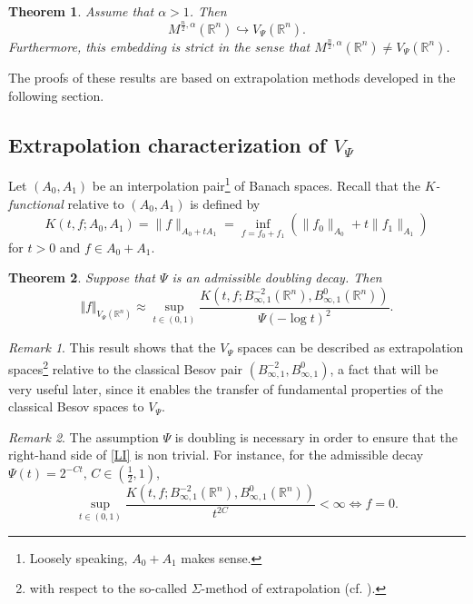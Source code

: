 \documentclass[11pt, a4paper,leqno]{amsart}
\newtheorem{theorem}{Theorem}
\theoremstyle{plain}
\numberwithin{equation}{section}
\theoremstyle{definition}
\theoremstyle{remark}
\newtheorem{remark}{Remark}
\def\R{\mathbb{R}}
\begin{document}
\begin{theorem}\label{Thm11}
Assume that $\alpha > 1$. Then $$M^{\frac{n}{2}, \alpha}(\R^n) \hookrightarrow V_\Psi(\R^n).$$ Furthermore, this embedding is strict in the sense that $M^{\frac{n}{2}, \alpha}(\R^n) \neq V_\Psi(\R^n)$.
\end{theorem}


The proofs of these results are based on extrapolation methods developed in the following section. 

\subsection{Extrapolation characterization of $V_\Psi$}

Let $(A_0, A_1)$ be an interpolation pair\footnote{Loosely speaking, $A_0+A_1$ makes sense.} of Banach spaces. Recall that the \emph{$K$-functional} relative to $(A_0, A_1)$ is defined by
$$
	K(t, f; A_0, A_1) = \|f\|_{A_0 + t A_1} = \inf_{f = f_0 + f_1} (\|f_0\|_{A_0} + t \|f_1\|_{A_1})
$$
for $t > 0$ and $f \in A_0 + A_1$. 


\begin{theorem}
\label{PropInterpol} Suppose that  $\Psi$ is an admissible doubling decay. Then
\begin{equation}\label{LI}
\Vert f\Vert_{V_{\Psi}(\mathbb{R}^{n})}\approx\sup_{t\in(0,1)}\frac
{K(t,f;B_{\infty,1}^{-2}(\mathbb{R}^{n}),B_{\infty,1}^{0}(\mathbb{R}^{n}%
))}{\Psi(-\log t)^{2}}.
\end{equation}

\end{theorem}

\begin{remark}
This result shows that the $V_{\Psi}$ spaces can be described as extrapolation
spaces\footnote{with respect to the so-called $\Sigma$-method of extrapolation (cf.
\cite{JM91}).} relative to the
classical Besov pair $(B_{\infty,1}^{-2},B_{\infty,1}^{0})$, a fact that will
be very useful later, since it enables the transfer of fundamental properties
of the classical Besov spaces to $V_{\Psi}$.
\end{remark}

\begin{remark}
	The assumption $\Psi$ is doubling is necessary in order to ensure that the right-hand side of \eqref{LI} is non trivial. For instance, for the admissible decay $\Psi(t) = 2^{-C t}, \, C \in (\frac{1}{2},1)$,  $$\sup_{t\in(0,1)}\frac
{K(t,f;B_{\infty,1}^{-2}(\mathbb{R}^{n}),B_{\infty,1}^{0}(\mathbb{R}^{n}%
))}{t^{2C}} < \infty \iff f = 0.$$
\end{remark}
\end{document}
